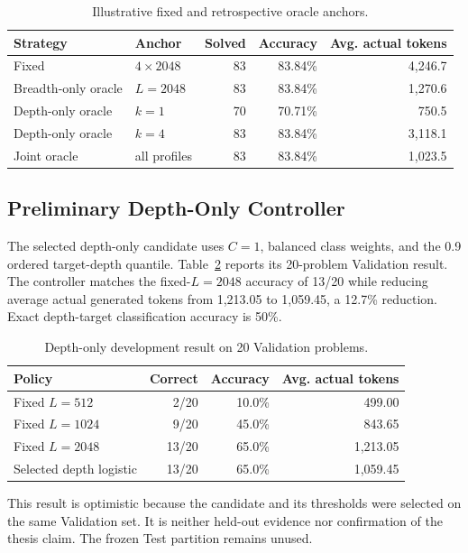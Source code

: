 \documentclass[runningheads]{llncs}
\begin{document}
\begin{table}
\caption{Illustrative fixed and retrospective oracle anchors.}
\label{tab:oracle}
\centering
\begin{tabular}{l|l|r|r|r}
\hline
Strategy & Anchor & Solved & Accuracy & Avg. actual tokens \\
\hline
Fixed & $4\times2048$ & 83 & 83.84\% & 4,246.7 \\
Breadth-only oracle & $L=2048$ & 83 & 83.84\% & 1,270.6 \\
Depth-only oracle & $k=1$ & 70 & 70.71\% & 750.5 \\
Depth-only oracle & $k=4$ & 83 & 83.84\% & 3,118.1 \\
Joint oracle & all profiles & 83 & 83.84\% & 1,023.5 \\
\hline
\end{tabular}
\end{table}

\subsection{Preliminary Depth-Only Controller}

The selected depth-only candidate uses $C=1$, balanced class weights, and the
0.9 ordered target-depth quantile. Table~\ref{tab:depthcontroller} reports its
20-problem Validation result. The controller matches the fixed-$L=2048$
accuracy of 13/20 while reducing average actual generated tokens from 1,213.05
to 1,059.45, a 12.7\% reduction. Exact depth-target classification accuracy is
50\%.

\begin{table}
\caption{Depth-only development result on 20 Validation problems.}
\label{tab:depthcontroller}
\centering
\begin{tabular}{l|r|r|r}
\hline
Policy & Correct & Accuracy & Avg. actual tokens \\
\hline
Fixed $L=512$  & 2/20  & 10.0\% & 499.00 \\
Fixed $L=1024$ & 9/20  & 45.0\% & 843.65 \\
Fixed $L=2048$ & 13/20 & 65.0\% & 1,213.05 \\
Selected depth logistic & 13/20 & 65.0\% & 1,059.45 \\
\hline
\end{tabular}
\end{table}

This result is optimistic because the candidate and its thresholds were selected
on the same Validation set. It is neither held-out evidence nor confirmation of
the thesis claim. The frozen Test partition remains unused.
\end{document}

